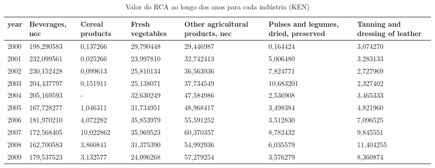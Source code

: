 \begin{table}
\centering
\caption{Valor do RCA ao longo dos anos para cada indústria (KEN)}
\begin{tabular}{p{1cm}p{2cm}p{2cm}p{2cm}p{2cm}p{2cm}p{2cm}}
\toprule
 year &  Beverages, nec &  Cereal products &  Fresh vegetables &  Other agricultural products, nec &  Pulses and legumes, dried, preserved &  Tanning and dressing of leather \\
\midrule
 2000 &      198,290583 &         0,137266 &         29,790448 &                         29,446987 &                              0,164424 &                         3,074270 \\
 2001 &      232,099561 &         0,025266 &         23,997810 &                         32,742413 &                              5,006480 &                         3,283133 \\
 2002 &      230,152428 &         0,099613 &         25,810134 &                         36,563936 &                              7,824771 &                         2,727969 \\
 2003 &      204,437797 &         0,151911 &         25,138071 &                         37,734549 &                             10,683201 &                         2,327402 \\
 2004 &      205,169593 &                - &         32,630249 &                         47,584986 &                              2,536908 &                         3,465333 \\
 2005 &      167,728277 &         1,046311 &         31,734951 &                         48,968417 &                              3,498384 &                         4,821960 \\
 2006 &      181,970210 &         4,072282 &         35,853979 &                         55,591252 &                              3,512830 &                         7,096525 \\
 2007 &      172,568405 &        10,022862 &         35,969523 &                         60,370357 &                              8,782432 &                         9,845551 \\
 2008 &      162,700583 &         3,860841 &         31,375390 &                         54,992936 &                              6,035579 &                        11,404255 \\
 2009 &      179,537523 &         3,132577 &         24,096268 &                         57,279254 &                              3,576279 &                         8,360874 \\

\end{tabular}
\end{table}
